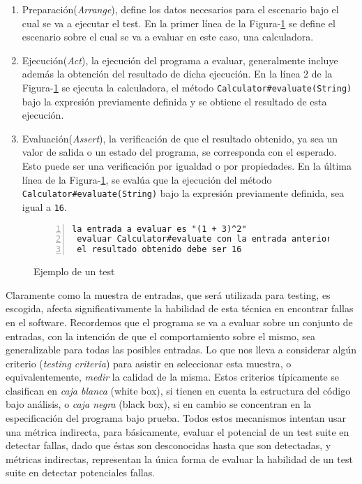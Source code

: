 \begin{enumerate}
	\item Preparaci\'on(\emph{Arrange}), define los datos necesarios para el escenario bajo el cual se va a ejecutar el test. En la primer l\'inea de la Figura-\ref{figures.examples.test.manual} se define el escenario sobre el cual se va a evaluar en este caso, una calculadora.
	
	\item Ejecuci\'on(\emph{Act}), la ejecuci\'on del programa a evaluar, generalmente incluye adem\'as la obtenci\'on del resultado de dicha ejecuci\'on. En la l\'inea 2 de la Figura-\ref{figures.examples.test.manual} se ejecuta la calculadora, el m\'etodo \texttt{Calculator\#evaluate(String)} bajo la expresi\'on previamente definida y se obtiene el resultado de esta ejecuci\'on.
	
	\item Evaluaci\'on(\emph{Assert}), la verificaci\'on de que el resultado obtenido, ya sea un valor de salida o un estado del programa, se corresponda con el esperado. Esto puede ser una verificaci\'on por igualdad o por propiedades. En la \'ultima l\'inea de la Figura-\ref{figures.examples.test.manual}, se eval\'ua que la ejecuci\'on del m\'etodo \texttt{Calculator\#evaluate(String)} bajo la expresi\'on previamente definida, sea igual a \texttt{16}.
\end{enumerate}

\begin{figure}
	\begin{lstlisting}[frame=single, mathescape=true,numbers=left,framexleftmargin=1.5em]
 la entrada a evaluar es "(1 + 3)^2"
 evaluar Calculator#evaluate con la entrada anterior
 el resultado obtenido debe ser 16
	\end{lstlisting}
	\caption{Ejemplo de un test}
	\label{figures.examples.test.manual}
\end{figure}

Claramente como la muestra de entradas, que ser\'a utilizada para testing, es escogida, afecta significativamente la habilidad de esta t\'ecnica en encontrar fallas en el software. Recordemos que el programa se va a evaluar sobre un conjunto de entradas, con la intenci\'on de que el comportamiento sobre el mismo, sea generalizable para todas las posibles entradas. Lo que nos lleva a considerar alg\'un criterio (\emph{testing criteria}) para asistir en seleccionar esta muestra, o equivalentemente, \emph{medir} la calidad de la misma. Estos criterios t\'ipicamente se clasifican en \emph{caja blanca} (white box), si tienen en cuenta la estructura del c\'odigo bajo an\'alisis, o \emph{caja negra} (black box), si en cambio se concentran en la especificaci\'on del programa bajo prueba. Todos estos mecanismos intentan usar una m\'etrica indirecta, para b\'asicamente, evaluar el potencial de un test suite en detectar fallas, dado que \'estas son desconocidas hasta que son detectadas, y m\'etricas indirectas, representan la \'unica forma de evaluar la habilidad de un test suite en detectar potenciales fallas.

